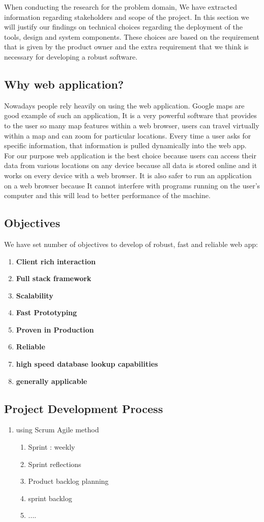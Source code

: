 When conducting the research for the problem domain, We have extracted information regarding stakeholders and scope of the project. In this section we will justify our findings on technical choices regarding the deployment of the tools, design and system components. These choices are based on the requirement that is given by the product owner and the extra requirement that we think is necessary for developing a robust software.   

\subsection{Why web application?}
Nowadays people rely heavily on using the web application. Google maps are good example of such an application, It is a very powerful software that provides to the user so many map features within a web browser, users can travel virtually within a map and can zoom for particular locations. Every time a user asks for specific information, that information is pulled dynamically into the web app.\\
 For our purpose web application is the best choice because users can access their data from various locations on any device because all data is stored online and it works on every device with a web browser. It is also safer to run an application on a web browser because It cannot interfere with programs running on the user's computer and this will lead to better performance of the machine.

\subsection{Objectives}
We have set number of objectives to develop of robust, fast and reliable web app:
\begin{enumerate}
	\item \textbf{Client rich interaction}
	\item \textbf{Full stack framework}
	\item \textbf{Scalability}
	\item \textbf{Fast Prototyping}
	\item \textbf{Proven in Production}
	\item \textbf{Reliable}
	\item \textbf{high speed database lookup capabilities}
	\item \textbf{generally applicable}
\end{enumerate}
\subsection{Project Development Process} %
\begin{enumerate}
	\item using Scrum Agile method
	\begin{enumerate}
		\item Sprint : weekly
		\item Sprint reflections
		\item Product backlog planning
		\item sprint backlog
		\item ....
	\end{enumerate}
\end{enumerate} 
